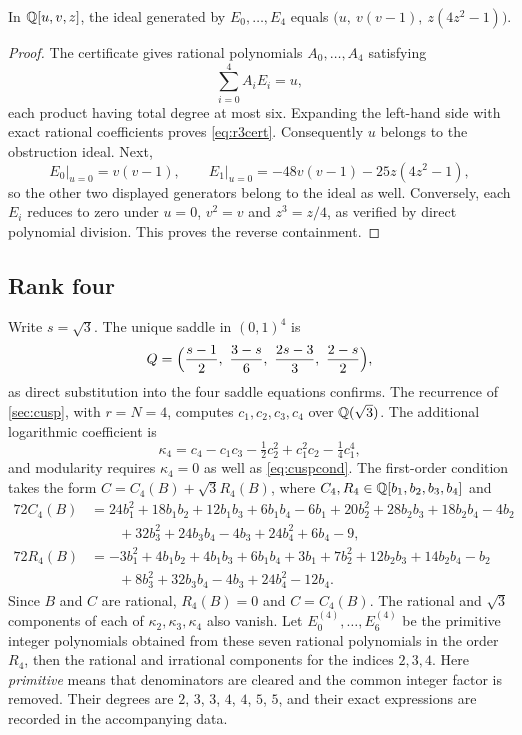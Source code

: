 \begin{lemma}\label{lem:r3elim}
In $\mathbb{Q}[u,v,z]$, the ideal generated by $E_0,\dots,E_4$ equals $\bigl(u,\ v(v-1),\ z(4z^2-1)\bigr)$.
\end{lemma}

\begin{proof}
The certificate gives rational polynomials $A_0,\dots,A_4$ satisfying
\begin{equation}\label{eq:r3cert}
\sum_{i=0}^4A_iE_i=u,
\end{equation}
each product having total degree at most six. Expanding the left-hand side with exact rational coefficients proves \eqref{eq:r3cert}. Consequently $u$ belongs to the obstruction ideal. Next,
\[
E_0\big|_{u=0}=v(v-1),\qquad E_1\big|_{u=0}=-48v(v-1)-25z(4z^2-1),
\]
so the other two displayed generators belong to the ideal as well. Conversely, each $E_i$ reduces to zero under $u=0$, $v^2=v$ and $z^3=z/4$, as verified by direct polynomial division. This proves the reverse containment.
\end{proof}

\subsection{Rank four}\label{app:r4}
Write $s=\sqrt3$. The unique saddle in $(0,1)^4$ is
\[
Q=\Bigl(\frac{s-1}2,\ \frac{3-s}6,\ \frac{2s-3}3,\ \frac{2-s}2\Bigr),
\]
as direct substitution into the four saddle equations confirms. The recurrence of \cref{sec:cusp}, with $r=N=4$, computes $c_1,c_2,c_3,c_4$ over $\mathbb{Q}(\sqrt3)$. The additional logarithmic coefficient is
\[
\kappa_4=c_4-c_1c_3-\tfrac12c_2^2+c_1^2c_2-\tfrac14c_1^4,
\]
and modularity requires $\kappa_4=0$ as well as \eqref{eq:cuspcond}. The first-order condition takes the form $C=C_4(B)+\sqrt3R_4(B)$, where $C_4,R_4\in\mathbb{Q}[b_1,b_2,b_3,b_4]$ and
\begin{align*}
72C_4(B)&=24b_1^2+18b_1b_2+12b_1b_3+6b_1b_4-6b_1+20b_2^2+28b_2b_3+18b_2b_4-4b_2\\
&\qquad+32b_3^2+24b_3b_4-4b_3+24b_4^2+6b_4-9,\\
72R_4(B)&=-3b_1^2+4b_1b_2+4b_1b_3+6b_1b_4+3b_1+7b_2^2+12b_2b_3+14b_2b_4-b_2\\
&\qquad+8b_3^2+32b_3b_4-4b_3+24b_4^2-12b_4.
\end{align*}
Since $B$ and $C$ are rational, $R_4(B)=0$ and $C=C_4(B)$. The rational and $\sqrt3$ components of each of $\kappa_2,\kappa_3,\kappa_4$ also vanish. Let $E^{(4)}_0,\dots,E^{(4)}_6$ be the primitive integer polynomials obtained from these seven rational polynomials in the order $R_4$, then the rational and irrational components for the indices $2,3,4$. Here \emph{primitive} means that denominators are cleared and the common integer factor is removed. Their degrees are $2$, $3$, $3$, $4$, $4$, $5$, $5$, and their exact expressions are recorded in the accompanying data.

